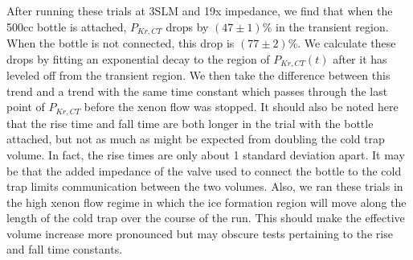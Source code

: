 \documentclass[12pt]{article}
\begin{document}
After running these trials at 3SLM and 19x impedance, we find that when the 500cc bottle is attached, $P_{Kr,CT}$ drops by $(47\pm1)$\% in the transient region. When the bottle is not connected, this drop is $(77\pm2)$\%. We calculate these drops by fitting an exponential decay to the region of $P_{Kr,CT}(t)$ after it has leveled off from the transient region. We then take the difference between this trend and a trend with the same time constant which passes through the last point of $P_{Kr,CT}$ before the xenon flow was stopped. It should also be noted here that the rise time and fall time are both longer in the trial with the bottle attached, but not as much as might be expected from doubling the cold trap volume. In fact, the rise times are only about 1 standard deviation apart. It may be that the added impedance of the valve used to connect the bottle to the cold trap limits communication between the two volumes. Also, we ran these trials in the high xenon flow regime in which the ice formation region will move along the length of the cold trap over the course of the run. This should make the effective volume increase more pronounced but may obscure tests pertaining to the rise and fall time constants.
\end{document}
